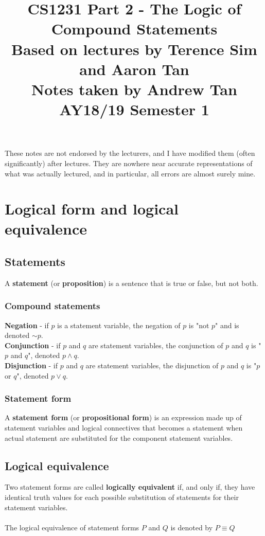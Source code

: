 \documentclass[a4paper]{article}
\title{%
	CS1231 Part 2 - The Logic of Compound Statements  \\
	\large Based on lectures by Terence Sim and Aaron Tan
	\\ Notes taken by Andrew Tan
	\\ AY18/19 Semester 1
	\\ }
\author{}
\date{\vspace{-5ex}}
\begin{document}
\maketitle

\begin{center}\begin{minipage}[c]{0.9\textwidth}\centering\footnotesize These notes are not endorsed by the lecturers, and I have modified them (often significantly) after lectures. They are nowhere near accurate representations of what was actually lectured, and in particular, all errors are almost surely mine.\end{minipage}\end{center}

\section{Logical form and logical equivalence}
\subsection{Statements}
A \textbf{statement} (or \textbf{proposition}) is a sentence that is true or false, but not both.
\subsubsection{Compound statements}
\textbf{Negation} - if $p$ is a statement variable, the negation of $p$ is "not $p$" and is denoted $\sim p$.\\
\textbf{Conjunction} - if $p$ and $q$ are statement variables, the conjunction of $p$ and $q$ is "$p$ and $q$", denoted $p \land q$.\\
\textbf{Disjunction} - if $p$ and $q$ are statement variables, the disjunction of $p$ and $q$ is "$p$ or $q$", denoted $p \lor q$.\\
\subsubsection{Statement form}
A \textbf{statement form} (or \textbf{propositional form}) is an expression made up of statement variables and logical connectives that becomes a statement when actual statement are substituted for the component statement variables.
\subsection{Logical equivalence}
Two statement forms are called \textbf{logically equivalent} if, and only if, they have identical truth values for each possible substitution of statements for their statement variables.\\ \\
The logical equivalence of statement forms $P$ and $Q$ is denoted by $P \equiv Q$
\end{document}
